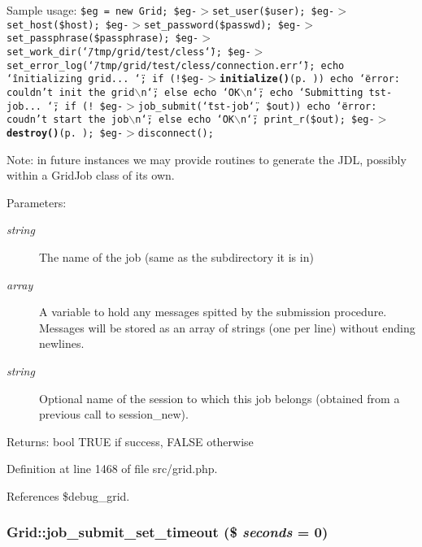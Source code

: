 Sample usage: {\tt  \$eg = new Grid; \$eg-$>$set\_\-user(\$user); \$eg-$>$set\_\-host(\$host); \$eg-$>$set\_\-password(\$passwd); \$eg-$>$set\_\-passphrase(\$passphrase); \$eg-$>$set\_\-work\_\-dir(\char`\"{}/tmp/grid/test/cless\char`\"{}); \$eg-$>$set\_\-error\_\-log(\char`\"{}/tmp/grid/test/cless/connection.err\char`\"{}); echo \char`\"{}initializing grid... \char`\"{}; if (!\$eg-$>${\bf initialize()}{\rm (p.\,\pageref{classGrid_a11})}) echo \char`\"{}error: couldn't init the grid$\backslash$n\char`\"{}; else echo \char`\"{}OK$\backslash$n\char`\"{}; echo \char`\"{}Submitting tst-job... \char`\"{}; if (! \$eg-$>$job\_\-submit(\char`\"{}tst-job\char`\"{}, \$out)) echo \char`\"{}error: coudn't start the job$\backslash$n\char`\"{}; else echo \char`\"{}OK$\backslash$n\char`\"{}; print\_\-r(\$out); \$eg-$>${\bf destroy()}{\rm (p.\,\pageref{classGrid_a12})}; \$eg-$>$disconnect(); }

\begin{Desc}
\item[Note:]in future instances we may provide routines to generate the JDL, possibly within a Grid\-Job class of its own.\end{Desc}
\begin{Desc}
\item[Parameters:]
\begin{description}
\item[{\em string}]The name of the job (same as the subdirectory it is in) \item[{\em array}]A variable to hold any messages spitted by the submission procedure. Messages will be stored as an array of strings (one per line) without ending newlines. \item[{\em string}]Optional name of the session to which this job belongs (obtained from a previous call to session\_\-new). \end{description}
\end{Desc}
\begin{Desc}
\item[Returns:]bool TRUE if success, FALSE otherwise \end{Desc}


Definition at line 1468 of file src/grid.php.

References \$debug\_\-grid.
\subsubsection{\setlength{\rightskip}{0pt plus 5cm}Grid::job\_\-submit\_\-set\_\-timeout (\$ {\em seconds} = 0)}\label{classGrid_a46}


